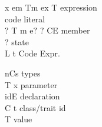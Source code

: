 \begin{minipage}{0.63\textwidth}
\begin{bnf}
      {x \mmid{} em \mmid{}Tm
\mmid{} ex \mmid{}  T
}{expression}\\      {
\mmid{} 
}        {code literal}\\      {$?$ T m e$?$ \mmid{} $?$ C\eq{}E }                                                    {member}\\      {$?$}                                          {state}\\      {L \mmid{} t \mmid{}  \mmid{} }           {Code Expr.}%
\end{bnf}
\end{minipage}
\begin{minipage}[t]{0.5\textwidth}
\begin{bnf}
      {nCs}                                                 {types}\\     {T x}                                                              {parameter}\\      {id\eq{}E}                                                         {declaration}\\     {C \mmid{} t}                                                      {class/trait id}\\      { T}                                                 {value}%
\end{bnf}
\end{minipage}


